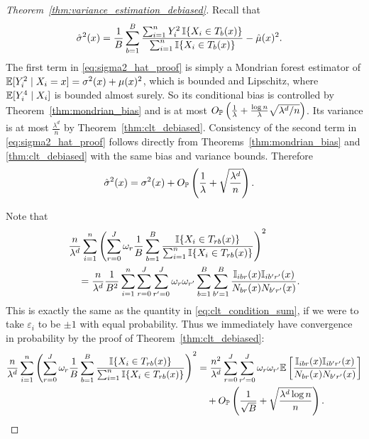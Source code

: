 \begin{proof}[Theorem~\ref{thm:variance_estimation_debiased}]


  Recall that
  \begin{align}
    \label{eq:sigma2_hat_proof}
    \hat\sigma^2(x)
    &=
    \frac{1}{B}
    \sum_{b=1}^{B}
    \frac{\sum_{i=1}^n Y_i^2 \, \I\{X_i \in T_b(x)\}}
    {\sum_{i=1}^n \I\{X_i \in T_b(x)\}}
    - \hat \mu(x)^2.
  \end{align}
  The first term in \eqref{eq:sigma2_hat_proof}
  is simply a Mondrian forest estimator of
  $\E[Y_i^2 \mid X_i = x] = \sigma^2(x) + \mu(x)^2$,
  which is bounded and Lipschitz,
  where $\E[Y_i^4 \mid X_i]$ is bounded almost surely.
  So its conditional bias is controlled
  by Theorem~\ref{thm:mondrian_bias} and is at most
  $O_\P \left( \frac{1}{\lambda} +
  \frac{\log n}{\lambda} \sqrt{\lambda^d / n} \right)$.
  Its variance is
  at most $\frac{\lambda^d}{n}$ by Theorem~\ref{thm:clt_debiased}.
  Consistency of the second term in \eqref{eq:sigma2_hat_proof}
  follows directly from Theorems~\ref{thm:mondrian_bias} and
  \ref{thm:clt_debiased} with the same bias and variance bounds. Therefore
  \begin{align*}
    \hat\sigma^2(x)
    &=
    \sigma^2(x)
    + O_\P \left(
      \frac{1}{\lambda}
      + \sqrt{\frac{\lambda^d}{n}}
    \right).
  \end{align*}

  Note that
  \begin{align*}
    &\frac{n}{\lambda^d}
    \sum_{i=1}^n
    \left(
      \sum_{r=0}^J
      \omega_r
      \frac{1}{B}
      \sum_{b=1}^B
      \frac{\I\{X_i \in T_{r b}(x)\}}
      {\sum_{i=1}^n \I\{X_i \in T_{r b}(x)\}}
    \right)^2 \\
    &\quad=
    \frac{n}{\lambda^d}
    \frac{1}{B^2}
    \sum_{i=1}^n
    \sum_{r=0}^J
    \sum_{r'=0}^J
    \omega_r
    \omega_{r'}
    \sum_{b=1}^B
    \sum_{b'=1}^B
    \frac{\I_{i b r}(x) \I_{i b' r'}(x)}
    {N_{b r}(x) N_{b' r'}(x)}.
  \end{align*}
  This is exactly the same as the quantity in
  \eqref{eq:clt_condition_sum}, if we were to take
  $\varepsilon_i$ to be $\pm 1$ with equal probability.
  Thus we immediately have convergence in probability
  by the proof of Theorem~\ref{thm:clt_debiased}:
  \begin{align*}
    \frac{n}{\lambda^d}
    \sum_{i=1}^n
    \left(
      \sum_{r=0}^J
      \omega_r
      \frac{1}{B}
      \sum_{b=1}^B
      \frac{\I\{X_i \in T_{r b}(x)\}}
      {\sum_{i=1}^n \I\{X_i \in T_{r b}(x)\}}
    \right)^2
    &=
    \frac{n^2}{\lambda^d}
    \sum_{r=0}^J
    \sum_{r'=0}^J
    \omega_r
    \omega_{r'}
    \E \left[
      \frac{\I_{i b r}(x) \I_{i b' r'}(x)}
      {N_{b r}(x) N_{b' r'}(x)}
    \right] \\
    &\quad+
    O_\P \left(
      \frac{1}{\sqrt B}
      + \sqrt{\frac{\lambda^d \log n}{n}}
    \right).
  \end{align*}


\end{proof}
